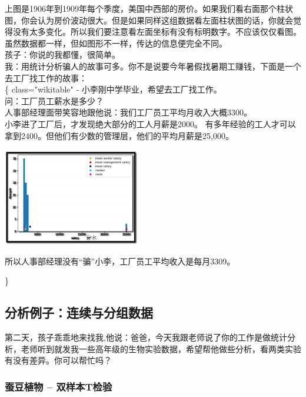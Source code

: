 上图是1906年到1909年每个季度，美国中西部的房价。如果我们看右面那个柱状图，你会认为房价波动很大。但是如果同样这组数据看左面柱状图的话，你就会觉得没有太多变化。所以我们要注意看左面坐标有没有标明数字。不应该仅仅看图。\\
虽然数据都一样，但如图形不一样，传达的信息便完全不同。\\
孩子：你说的我都懂，很简单。\\
我：用统计分析骗人的故事可多。你不是说要今年暑假找暑期工赚钱，下面是一个去工厂找工作的故事：\\
\{\textbar{} class="wikitable" \textbar{}-
\textbar{}小李刚中学毕业，希望去工厂找工作。\\
问：工厂员工薪水是多少？\\
人事部经理面带笑容地跟他说：我们工厂员工平均月收入大概3300。\\
小李进了工厂后，才发现绝大部分的工人月薪是2000。
有多年经验的工人才可以拿到2400。但他们有少数的管理层，他们的平均月薪是25,000。


\includegraphics[width=6cm]{AverageSalaryScreenshot_2021-07-31_1715021.jpg}

所以人事部经理没有``骗''小李，工厂员工平均收入是每月3309。

\textbar{}\}

\hypertarget{ux7bb1ux7ebfux56fe-box-and-whisker-plot}{%
\subsection{分析例子：连续与分组数据}\label{ux7bb1ux7ebfux56fe-box-and-whisker-plot}}

第二天，孩子乖乖地来找我,他说：爸爸，今天我跟老师说了你的工作是做统计分析，老师听到就发我一些高年级的生物实验数据，希望帮他做些分析，看两类实验有没有差异。你可以帮忙吗？\\

\hypertarget{ux8695ux8c46ux690dux7269---ux53ccux6837ux672ctux68c0ux9a8c}{%
\subsubsection{蚕豆植物 --
双样本T检验}\label{ux8695ux8c46ux690dux7269---ux53ccux6837ux672ctux68c0ux9a8c}}

